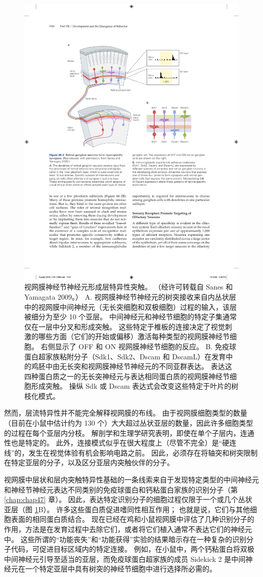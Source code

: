 \begin{figure}[htbp]
	\centering
	\includegraphics[width=0.75\linewidth]{chap48/fig_48_2}
	\caption{视网膜神经节神经元形成层特异性突触。 （经许可转载自 Sanes 和 Yamagata 2009。） A. 视网膜神经节神经元的树突接收来自内丛状层中的视网膜中间神经元（无长突细胞和双极细胞）过程的输入，该层被细分为至少 10 个亚层。 中间神经元和神经节细胞的特定子集通常仅在一层中分叉和形成突触。 这些特定于椎板的连接决定了视觉刺激的哪些方面（它们的开始或偏移）激活每种类型的视网膜神经节细胞。 右侧显示了 OFF 和 ON 视网膜神经节细胞的反应。 B. 免疫球蛋白超家族粘附分子（Sdk1、Sdk2、Dscam 和 DscamL）在发育中的鸡胚中由无长突和视网膜神经节神经元的不同亚群表达。 表达这四种蛋白质之一的无长突神经元与表达相同蛋白质的视网膜神经节细胞形成突触。 操纵 Sdk 或 Dscam 表达式会改变这些特定于叶片的树枝化模式。}
	\label{fig:48_2}
\end{figure}

然而，层流特异性并不能完全解释视网膜的布线。 由于视网膜细胞类型的数量（目前在小鼠中估计约为 130 个）大大超过丛状亚层的数量，因此许多细胞类型的过程在每个亚层内分枝。 解剖学和生理学研究表明，即使在单个子层内，连通性也是特定的。 此外，连接模式似乎在很大程度上（尽管不完全）是“硬连线”的，发生在视觉体验有机会影响电路之前。 因此，必须存在将轴突和树突限制在特定亚层的分子，以及区分亚层内突触伙伴的分子。

视网膜中层状和层内突触特异性基础的一条线索来自于发现特定类型的中间神经元和神经节神经元表达不同类别的免疫球蛋白和钙粘蛋白家族的识别分子（第 \ref{chap:chap47} 章）。 因此，表达特定识别分子的细胞过程仅限于一个或几个丛状亚层（图 \ref{fig:48_2}B）。 许多这些蛋白质促进嗜同性相互作用； 也就是说，它们与其他细胞表面的相同蛋白质结合。 现在已经在鸡和小鼠视网膜中评估了几种识别分子的作用，方法是在发育过程中去除它们，或者将它们植入通常不表达它们的神经元中。 这些所谓的“功能丧失”和“功能获得”实验的结果暗示存在一种复杂的识别分子代码，可促进目标区域内的特定连接。 例如，在小鼠中，两个钙粘蛋白将双极中间神经元引导至适当的亚层，而免疫球蛋白超家族的成员 Sidekick 2 是中间神经元在一个特定亚层中具有树突的神经节细胞中进行选择所必需的。

